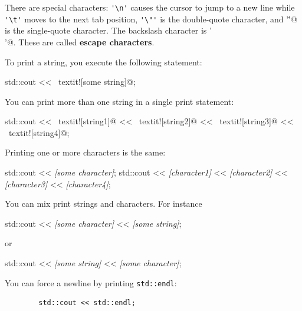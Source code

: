 There are special characters: 
\verb!'\n'! causes the cursor to jump to a new line while 
\verb!'\t'! moves to the next tab position, 
\verb!'\"'! is the double-quote character, 
and \verb@'\''@ is the single-quote character. 
The backslash character is \verb@'\\'@. 
These are called \textbf{escape characters}.

To print a string, you execute the following statement:
\begin{console}[frame=none, commandchars=\~\!\@]

        std::cout << ~textit![some string]@;

\end{console}
You can print more than one string in a single print statement:
\begin{console}[frame=none, commandchars=\~\!\@]

        std::cout << ~textit![string1]@ << ~textit![string2]@
                  << ~textit![string3]@ << ~textit![string4]@;

\end{console}
Printing one or more characters is the same:
\begin{console}[frame=none, commandchars=\\\{\}]

        std::cout << \textit{[some character]};
        std::cout << \textit{[character1]} << \textit{[character2]}
                  << \textit{[character3]} << \textit{[character4]};

\end{console}

You can mix print strings and characters. For instance
\begin{console}[frame=none, commandchars=\\\{\}]

        std::cout << \textit{[some character]}
	          << \textit{[some string]};

\end{console}
or
\begin{console}[frame=none, commandchars=\\\{\}]

        std::cout << \textit{[some string]}
	          << \textit{[some character]};

\end{console}
You can force a newline by printing \verb!std::endl!:
\begin{verbatim}
        std::cout << std::endl;
\end{verbatim}



